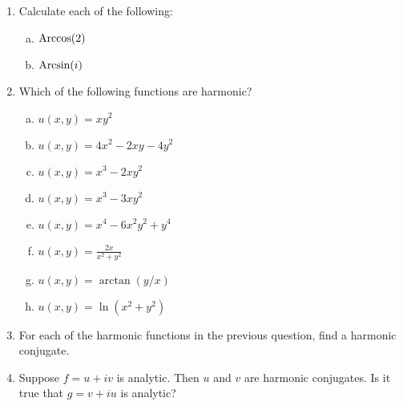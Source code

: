 \begin{enumerate}
\begin{enumerate}[a)]
\end{enumerate}

\item Calculate each of the following:

\begin{enumerate}[a)]
\item $\mathrm{Arccos}(2)$
\item $\mathrm{Arcsin}(i)$
\end{enumerate}

\item Which of the following functions are harmonic?

\begin{enumerate}[a)]
\item $u(x,y) = xy^2$
\item $u(x,y) = 4x^2 - 2xy - 4y^2$
\item $u(x,y) = x^3 - 2xy^2$
\item $u(x,y) = x^3 - 3xy^2$
\item $u(x,y) = x^4 - 6x^2y^2 + y^4$
\item $u(x,y) = \frac{2x}{x^2 + y^2}$
\item $u(x,y) = \arctan(y/x)$
\item $u(x,y) = \ln(x^2 + y^2)$
\end{enumerate}

\item For each of the harmonic functions in the previous question, find a harmonic conjugate.

\item Suppose $f = u + iv$ is analytic. Then $u$ and $v$ are harmonic conjugates. Is it true that $g = v + iu$ is analytic?


\end{enumerate}